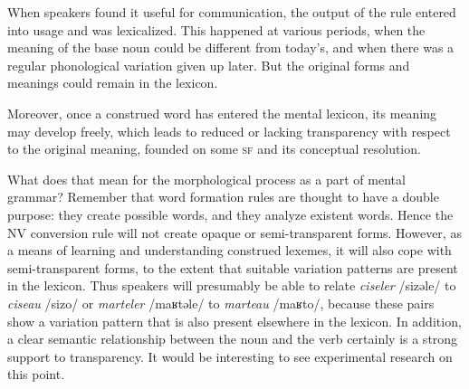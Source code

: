 \documentclass[output=paper]{langsci/langscibook}
\begin{document}
\begin{table}
\caption{N\textrightarrow{}V conversion in Latin}
\label{tab:Schwarze:7}
\end{table}

When speakers found it useful for communication, the output of the rule entered into usage and was lexicalized. This happened at various periods, when the meaning of the base noun could be different from today's, and when there was a regular phonological variation given up later. But the original forms and meanings could remain in the lexicon.

Moreover, once a construed word has entered the mental lexicon, its meaning may develop freely, which leads to reduced or lacking transparency with respect to the original meaning, founded on some \textsc{sf}
and its conceptual resolution.

What does that mean for the morphological process as a part of mental grammar? Remember that word formation rules are thought to have a double purpose: they create possible words, and they analyze existent words.
Hence the N\textrightarrow{}V conversion rule will not create opaque or semi-transparent forms. However, as a means of learning and understanding construed lexemes, it will also cope with semi-transparent forms, to the extent that suitable variation patterns are present in the lexicon. Thus speakers will presumably be able to relate \emph{ciseler} /sizǝle/ to
\emph{ciseau} /sizo/ or \emph{marteler} /maʁtǝle/ to \emph{marteau}
/maʁto/, because these pairs show a variation pattern that is also present elsewhere in the lexicon. In addition, a clear semantic relationship between the noun and the verb certainly is a strong support to transparency. It would be interesting to see experimental research on this point.
\end{document}
